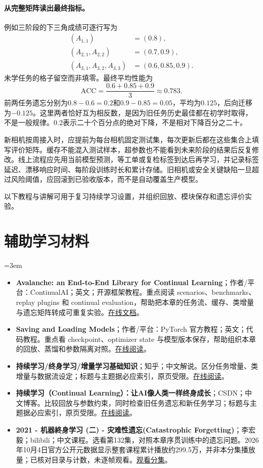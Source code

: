 \paragraph{从完整矩阵读出最终指标。}
例如三阶段的下三角成绩可逐行写为
\begin{align*}
 (A_{1,1})&=(0.8),\\
 (A_{2,1},A_{2,2})&=(0.7,0.9),\\
 (A_{3,1},A_{3,2},A_{3,3})&=(0.6,0.85,0.9).
\end{align*}
未学任务的格子留空而非填零。最终平均性能为
\begin{equation*}
 \mathrm{ACC}=\frac{0.6+0.85+0.9}{3}\approx0.783.
\end{equation*}
前两任务遗忘分别为$0.8-0.6=0.2$和$0.9-0.85=0.05$，平均为$0.125$，后向迁移为$-0.125$。这里两者恰好互为相反数，是因为旧任务历史最佳都在初学时取得，不是一般规律。$0.2$表示二十个百分点的绝对下降，不是相对下降百分之二十。

新相机按周接入时，应提前为每台相机固定测试集，每次更新后都在这些集合上填写评价矩阵。缓存不能混入测试样本，超参数也不能看到未来阶段的结果后反复修改。线上流程应先用当前模型预测，等工单或复检标签到达后再学习，并记录标签延迟、漂移响应时间、每阶段训练时长和累计存储。旧相机或安全关键缺陷一旦超过风险阈值，应回滚到已验收版本，而不是自动覆盖生产模型。

以下教程与讲解可用于复习持续学习设置，并组织回放、模块保存和遗忘评价实验。
\section*{辅助学习材料}
\begingroup
\emergencystretch=3em
\begin{itemize}
\item \textbf{Avalanche: an End-to-End Library for Continual Learning}；作者/平台：ContinualAI；英文；开源框架教程。重点阅读 scenarios、benchmarks、replay plugins 和 continual evaluation，帮助把本章的任务流、缓存、类增量与遗忘矩阵转成可重复实验。\href{https://avalanche.continualai.org/}{在线文档}。
\item \textbf{Saving and Loading Models}；作者/平台：PyTorch 官方教程；英文；代码教程。重点看 checkpoint、optimizer state 与模型版本保存，帮助组织本章的回放、蒸馏和参数隔离对照。\href{https://docs.pytorch.org/tutorials/beginner/saving\_loading\_models.html}{在线阅读}。
\item \textbf{持续学习/终身学习/增量学习基础知识}；知乎；中文解说。区分任务增量、类增量与数据流设定；标题与主题据必应索引，原页受限。\href{https://zhuanlan.zhihu.com/p/696297033}{在线阅读}。
\item \textbf{持续学习（Continual Learning）：让AI像人类一样终身成长}；CSDN；中文博客。比较回放与参数约束，同时检查旧任务遗忘和新任务学习；标题与主题据必应索引，原页受限。\href{https://blog.csdn.net/daqianai/article/details/152846877}{在线阅读}。
\item \textbf{2021 - 机器終身学习 (二) - 灾难性遗忘(Catastrophic Forgetting)}；李宏毅；bilibili；中文课程。选看第132集，对照本章序贯训练中的遗忘问题。2026年10月4日官方公开元数据显示整套课程累计播放约299.5万，并非本分集播放量；已核对目录与计数，未逐帧观看。\href{https://www.bilibili.com/video/BV1Wv411h7kN/?p=132}{观看分集}。
\end{itemize}
\endgroup
